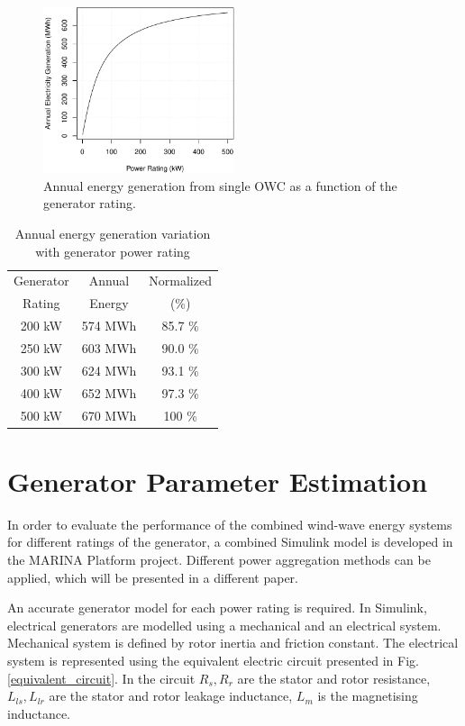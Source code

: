 \documentclass[twocolumn]{article}
\begin{document}
  \begin{figure}[]
    \centering
    \includegraphics[width=0.5\textwidth]{generator_rating}
    \caption{Annual energy generation from single OWC as a function of the generator rating.} 
    \label{generator_rating}
  \end{figure}
  
  \begin{table}[]
    \centering
    \begin{tabular}{ccc}
     Generator & Annual & Normalized \\
     Rating & Energy & (\%) \\
    \hline
  200 kW & 574 MWh & 85.7 \% \\
  250 kW & 603 MWh & 90.0 \% \\
  300 kW & 624 MWh & 93.1 \% \\
  400 kW & 652 MWh & 97.3 \% \\
  500 kW & 670 MWh & 100 \%\\
  \hline
    \end{tabular}
    \caption{Annual energy generation variation with generator power rating}
    \label{generator_rating_table}
  \end{table}
  
\clearpage  
\section{Generator Parameter Estimation}

In order to evaluate the performance of the combined wind-wave energy systems for different ratings of the generator, a combined Simulink model is developed in the MARINA Platform project. Different power aggregation methods can be applied, which will be presented in a different paper.

An accurate generator model for each power rating is required. In Simulink, electrical generators are modelled using a mechanical and an electrical system. Mechanical system is defined by rotor inertia and friction constant. The electrical system is represented using the equivalent electric circuit presented in Fig. \ref{equivalent_circuit}. In the circuit $R_s, R_r$ are the stator and rotor resistance, $L_{ls}, L_{lr}$ are the stator and rotor leakage inductance, $L_m$ is the magnetising inductance.
\end{document}
